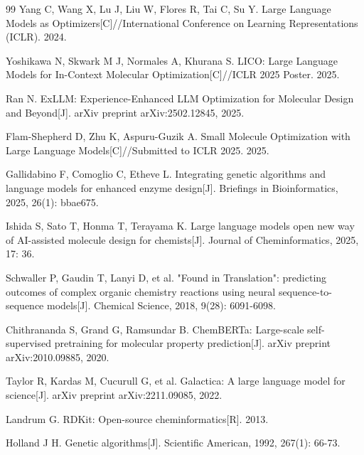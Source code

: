 \begin{thebibliography}{99}
Yang C, Wang X, Lu J, Liu W, Flores R, Tai C, Su Y. Large Language Models as Optimizers[C]//International Conference on Learning Representations (ICLR). 2024.

Yoshikawa N, Skwark M J, Normales A, Khurana S. LICO: Large Language Models for In-Context Molecular Optimization[C]//ICLR 2025 Poster. 2025.

Ran N. ExLLM: Experience-Enhanced LLM Optimization for Molecular Design and Beyond[J]. arXiv preprint arXiv:2502.12845, 2025.

Flam-Shepherd D, Zhu K, Aspuru-Guzik A. Small Molecule Optimization with Large Language Models[C]//Submitted to ICLR 2025. 2025.

Gallidabino F, Comoglio C, Etheve L. Integrating genetic algorithms and language models for enhanced enzyme design[J]. Briefings in Bioinformatics, 2025, 26(1): bbae675.

Ishida S, Sato T, Honma T, Terayama K. Large language models open new way of AI-assisted molecule design for chemists[J]. Journal of Cheminformatics, 2025, 17: 36.

Schwaller P, Gaudin T, Lanyi D, et al. "Found in Translation": predicting outcomes of complex organic chemistry reactions using neural sequence-to-sequence models[J]. Chemical Science, 2018, 9(28): 6091-6098.

Chithrananda S, Grand G, Ramsundar B. ChemBERTa: Large-scale self-supervised pretraining for molecular property prediction[J]. arXiv preprint arXiv:2010.09885, 2020.

Taylor R, Kardas M, Cucurull G, et al. Galactica: A large language model for science[J]. arXiv preprint arXiv:2211.09085, 2022.

Landrum G. RDKit: Open-source cheminformatics[R]. 2013.

Holland J H. Genetic algorithms[J]. Scientific American, 1992, 267(1): 66-73.

\end{thebibliography}
